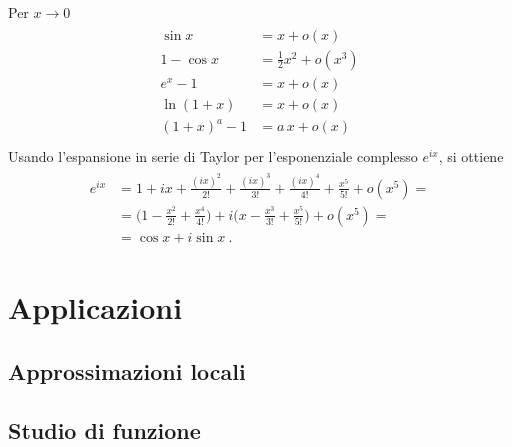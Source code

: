 \documentclass[letterpaper,10pt,italian]{jupyterBook}
\begin{document}
\sphinxAtStartPar
{}
Per \(x \rightarrow 0\)
\begin{equation*}
\begin{split}\begin{aligned}
  \sin x      & = x +o(x) \\
  1 - \cos x  & = \frac{1}{2} x^2 + o(x^3) \\
  e^x - 1     & = x + o(x) \\
  \ln(1+x)    & = x + o(x) \\
  (1+x)^a - 1 & = a \, x + o(x) \\
\end{aligned}\end{split}
\end{equation*}
\sphinxAtStartPar
{} Usando l’espansione in serie di Taylor per l’esponenziale complesso \(e^{ix}\), si ottiene
\begin{equation*}
\begin{split}\begin{aligned}
e^{ix} & = 1 + ix + \frac{(ix)^2}{2!} + \frac{(ix)^3}{3!} + \frac{(ix)^4}{4!} + \frac{x^5}{5!} + o(x^5) = \\
& = \Big( 1 - \frac{x^2}{2!} + \frac{x^4}{4!} \Big) + i \Big( x - \frac{x^3}{3!} + \frac{x^5}{5!} \Big) + o(x^5) = \\
& = \cos x + i \sin x \ .
\end{aligned}\end{split}
\end{equation*}

\section{Applicazioni}
\label{\detokenize{ch/infinitesimal_calculus/derivatives:applicazioni}}\label{\detokenize{ch/infinitesimal_calculus/derivatives:infinitesimal-calculus-derivatives-applications}}

\subsection{Approssimazioni locali}
\label{\detokenize{ch/infinitesimal_calculus/derivatives:approssimazioni-locali}}

\subsection{Studio di funzione}
\label{\detokenize{ch/infinitesimal_calculus/derivatives:studio-di-funzione}}
\end{document}
